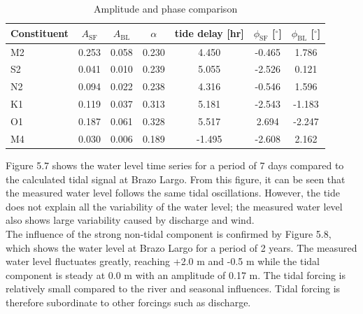 \begin{table}[h!]
\centering
\caption{Amplitude and phase comparison}
\begin{tabular}{lcccccc}
\hline
Constituent & $A_{\text{SF}}$ & $A_{\text{BL}}$ & $\alpha$ & tide delay [hr] & $\phi_{\text{SF}}$ [$^\circ$] & $\phi_{\text{BL}}$ [$^\circ$] \\
\hline
M2 & 0.253 & 0.058 & 0.230 & 4.450 & -0.465 & 1.786 \\
S2 & 0.041 & 0.010 & 0.239 & 5.055 & -2.526 & 0.121 \\
N2 & 0.094 & 0.022 & 0.238 & 4.316 & -0.546 & 1.596 \\
K1 & 0.119 & 0.037 & 0.313 & 5.181 & -2.543 & -1.183 \\
O1 & 0.187 & 0.061 & 0.328 & 5.517 & 2.694 & -2.247 \\
M4 & 0.030 & 0.006 & 0.189 & -1.495 & -2.608 & 2.162 \\
\hline
\end{tabular}
\end{table}

Figure 5.7 shows the water level time series for a period of 7 days compared to the calculated tidal signal at Brazo Largo. From this figure, it can be seen that the measured water level follows the same tidal oscillations. However, the tide does not explain all the variability of the water level; the measured water level also shows large variability caused by discharge and wind. 
\\The influence of the strong non-tidal component is confirmed by Figure 5.8, which shows the water level at Brazo Largo for a period of 2 years. The measured water level fluctuates greatly, reaching +2.0 m and -0.5 m while the tidal component is steady at 0.0 m with an amplitude of 0.17 m. The tidal forcing is relatively small compared to the river and seasonal influences. Tidal forcing is therefore subordinate to other forcings such as discharge.

